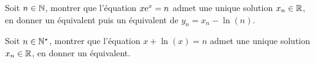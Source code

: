 \begin{exercice}    
    Soit $n \in \mathbb{N}$, montrer que l'équation $x \mathrm{e}^x = n$ admet une unique solution $x_n \in \mathbb{R}$, en donner un équivalent puis un équivalent de $y_n = x_n - \ln(n)$.  
\end{exercice}

\begin{exercice}
    Soit $n \in \mathbb{N}^\star$, montrer que l'équation $x + \ln(x) = n$ admet une unique solution $x_n \in \mathbb{R}$, en donner un équivalent.
\end{exercice}
    
